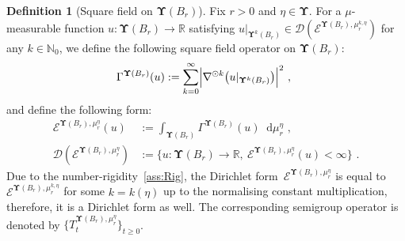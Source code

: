 \documentclass[11pt,letterpaper]{amsart}
\newcommand{\dom}[1]{\mathcal D(#1)}
\newcommand{\sem}[1]{\{#1\}_{t \ge 0}}
\newcommand{\diff}{\mathop{}\!\mathrm{d}}
\newcommand{\set}[1]{\left\{#1\right\}}							%
\newcommand{\tonde}[1]{\left(#1\right)}
\newcommand{\ttonde}[1]{\big({#1}\big)}
\DeclareMathOperator{\car}{\mathbf 1}
\newcommand{\N}{{\mathbb N}}
\newcommand{\R}{{\mathbb R}}
\newcommand{\trid}{{\star}}
\newcommand{\comma}{\,\,\mathrm{,}\;\,}
\newcommand{\fstop}{\,\,\mathrm{.}}
\newcommand{\cdc}{\Gamma}
\newcommand{\Cyl}[1]{\mcF^\dUpsilon\mcC^\infty_b(#1)}
\newcommand{\Dz}{\mcD} %
\newcommand{\QP}{{\mu}}
\newcommand{\dUpsilon}{{\mathbf \Upsilon}}
\newcommand{\U}{\dUpsilon}
\newcommand{\E}{\mathcal E}
\renewcommand{\1}{\mathbf 1}
\numberwithin{equation}{section}
\theoremstyle{plain}
\theoremstyle{definition}
\newtheorem{defs}[thm]{Definition}%
\theoremstyle{remark}
\begin{document}
\begin{defs}[Square field on $\U(B_r)$]\label{d:DT2} 
Fix $r>0$ and $\eta \in \U$. For a $\mu$-measurable function $u: \U(B_r) \to \R$ satisfying $u|_{\U^k(B_r)} \in \mathcal D(\E^{\U(B_r), \mu_r^{k, \eta}})$ for any $k \in \N_0$, we define the following square field operator on $\U(B_r)$:
\begin{align} \label{d:GSF}
\Gamma^{\U(B_r)}(u) := \sum_{k=0}^\infty \Bigl|\nabla^{\odot k} \bigl(u |_{\U^k(B_r)}\bigr)\Bigr|^2 \comma
\end{align}
and define the following form:
\begin{align*}
\E^{\U(B_r), \mu_r^\eta}(u)&:=\int_{\U(B_r)} \Gamma^{\U(B_r)}(u) \diff\mu_{r}^{\eta} \comma
\\
\dom{\E^{\U(B_r), \mu_r^\eta}}&:=\{u: \U(B_r) \to \R,\ \E^{\U(B_r), \mu_r^\eta}(u)<\infty \} \fstop
\end{align*}
Due to the number-rigidity~\ref{ass:Rig}, the Dirichlet form~$\E^{\U(B_r), \mu_r^\eta}$ is equal to $\E^{\U(B_r), \mu_r^{k, \eta}}$ for some $k=k(\eta)$ up to the normalising constant multiplication, therefore, it is a Dirichlet form as well. 
The corresponding semigroup operator is denoted by $\sem{T_t^{\U(B_r), \QP_r^\eta}}$.

\end{defs} 
\end{document}
